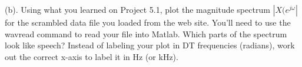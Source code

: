 (b). Using what you learned on Project 5.1, plot the magnitude spectrum $ |X(e^{j \omega}| $ for the scrambled data file you loaded from the web site. You’ll need to use the wavread command to read your file into Matlab. Which parts of the spectrum look like speech? Instead of labeling your plot in DT frequencies (radians), work out the correct x-axis to label it in Hz (or kHz).
